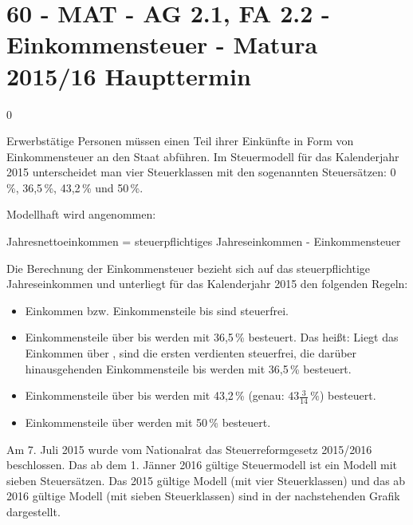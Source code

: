 \section{60 - MAT - AG 2.1, FA 2.2 - Einkommensteuer - Matura 2015/16 Haupttermin}

\begin{langesbeispiel} \item[0] %
	
 Erwerbstätige Personen müssen einen Teil ihrer Einkünfte in Form von Einkommensteuer an den Staat abführen. Im Steuermodell für das Kalenderjahr 2015 unterscheidet man vier Steuerklassen mit den sogenannten Steuersätzen: 0\,\%, 36,5\,\%, 43,2\,\% und 50\,\%. 

Modellhaft wird angenommen:  

Jahresnettoeinkommen = steuerpflichtiges Jahreseinkommen - Einkommensteuer 

Die Berechnung der Einkommensteuer bezieht sich auf das steuerpflichtige Jahreseinkommen und unterliegt für das Kalenderjahr 2015 den folgenden Regeln:
\begin{itemize}
	\item Einkommen bzw. Einkommensteile bis  sind steuerfrei.
	\item  Einkommensteile über  bis  werden mit 36,5\,\% besteuert. Das heißt: Liegt das Einkommen über , sind die ersten verdienten  steuerfrei, die darüber hinausgehenden Einkommensteile bis  werden mit 36,5\,\% besteuert. 
	\item Einkommensteile über  bis  werden mit 43,2\,\% (genau: $43\frac{3}{14}\,\%$) besteuert. 
	\item Einkommensteile über  werden mit 50\,\% besteuert.
\end{itemize}

Am 7. Juli 2015 wurde vom Nationalrat das Steuerreformgesetz 2015/2016 beschlossen. Das ab dem 1. Jänner 2016 gültige Steuermodell ist ein Modell mit sieben Steuersätzen. Das 2015 gültige Modell (mit vier Steuerklassen) und das ab 2016 gültige Modell (mit sieben Steuerklassen) sind in der nachstehenden Grafik dargestellt.


\end{langesbeispiel}

